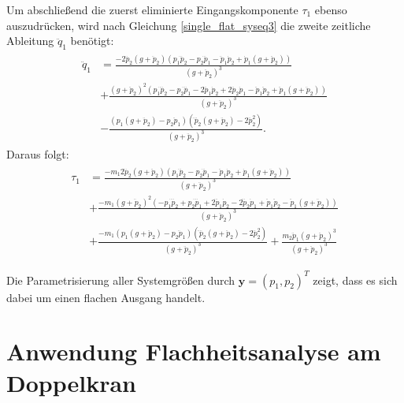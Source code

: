 Um abschließend die zuerst eliminierte Eingangskomponente $\tau_1$ ebenso auszudrücken, wird nach Gleichung \eqref{single_flat_syseq3} die zweite zeitliche Ableitung $\ddot{q}_1$ benötigt:
\begin{align}
	\begin{split}
	\ddot{q}_1 &=
	\frac{-2 \dddot{p}_{2} \left(g + \ddot{p}_{2}\right) \left(p_{1} \dddot{p}_{2} - p_{2} \dddot{p}_{1} - \ddot{p}_{1} \dot{p}_{2} + \dot{p}_{1} \left(g + \ddot{p}_{2}\right)\right) }{\left(g + \ddot{p}_{2}\right)^{3}} \\	
	&+ \frac{\left(g + \ddot{p}_{2}\right)^{2} \left(p_{1} \ddddot{p}_{2} - p_{2} \ddddot{p}_{1} - 2 \dddot{p}_{1} \dot{p}_{2} + 2 \dddot{p}_{2} \dot{p}_{1} - \ddot{p}_{1} \ddot{p}_{2} + \ddot{p}_{1} \left(g + \ddot{p}_{2}\right)\right)}{\left(g + \ddot{p}_{2}\right)^{3}}\\	
	&- \frac{\left(p_{1} \left(g + \ddot{p}_{2}\right) - p_{2} \ddot{p}_{1}\right) \left(\ddddot{p}_{2} \left(g + \ddot{p}_{2}\right) - 2 \dddot{p}_{2}^{2}\right)}{\left(g + \ddot{p}_{2}\right)^{3}}.
	\end{split}
\end{align}
Daraus folgt:
\begin{align}
	\begin{split}
	\tau_1 &=
	\frac{- m_{1} 2 \dddot{p}_{2} \left(g + \ddot{p}_{2}\right) \left(p_{1} \dddot{p}_{2} - p_{2} \dddot{p}_{1} - \ddot{p}_{1} \dot{p}_{2} + \dot{p}_{1} \left(g + \ddot{p}_{2}\right)\right)}{\left(g + \ddot{p}_{2}\right)^{3}} \\	
	&+ \frac{- m_{1} \left(g + \ddot{p}_{2}\right)^{2} \left(- p_{1} \ddddot{p}_{2} + p_{2} \ddddot{p}_{1} + 2 \dddot{p}_{1} \dot{p}_{2} - 2 \dddot{p}_{2} \dot{p}_{1} + \ddot{p}_{1} \ddot{p}_{2} - \ddot{p}_{1} \left(g + \ddot{p}_{2}\right)\right)}{\left(g + \ddot{p}_{2}\right)^{3}} \\
	&+ \frac{-m_1 \left(p_{1} \left(g + \ddot{p}_{2}\right) - p_{2} \ddot{p}_{1}\right) \left(\ddddot{p}_{2} \left(g + \ddot{p}_{2}\right) - 2 \dddot{p}_{2}^{2}\right)}{\left(g + \ddot{p}_{2}\right)^{3}} + \frac{m_{2} \ddot{p}_{1} \left(g + \ddot{p}_{2}\right)^{3}}{\left(g + \ddot{p}_{2}\right)^{3}}
	\end{split}
\end{align}

Die Parametrisierung aller Systemgrößen durch $\mathbf{y} = (p_1, p_2)^T$ zeigt, dass es sich dabei um einen flachen Ausgang handelt.

\section{Anwendung Flachheitsanalyse am Doppelkran}
\label{sec:flatness_analysis_double_crane}

